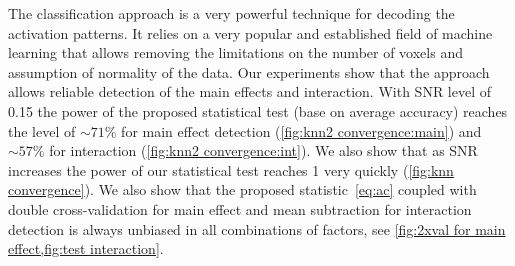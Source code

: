 The classification approach is a very powerful technique for decoding the activation patterns. It relies on a very popular and established field of machine learning that allows removing the limitations on the number of voxels and assumption of normality of the data. Our experiments show that the approach allows reliable detection of the main effects and interaction. With SNR level of 0.15 the power of the proposed statistical test (base on average accuracy) reaches the level of $\sim71\%$ for main effect detection (\autoref{fig:knn2 convergence:main}) and $\sim57\%$ for interaction (\autoref{fig:knn2 convergence:int}). We also show that as SNR increases the power of our statistical test reaches 1 very quickly (\autoref{fig:knn convergence}). We also show that the proposed statistic~\eqref{eq:ac} coupled with double cross-validation for main effect and mean subtraction for interaction detection is always unbiased in all combinations of factors, see \cref{fig:2xval for main effect,fig:test interaction}.
